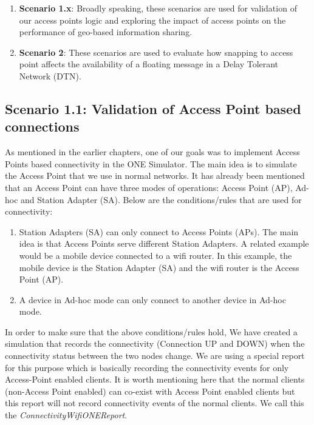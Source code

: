 \begin{enumerate}
	\item \textbf{Scenario 1.x}: Broadly speaking, these scenarios are used for validation of our access points logic and exploring the impact of access points on the performance of geo-based information sharing.
	\item \textbf{Scenario 2}: These scenarios are used to evaluate how snapping to access point affects the availability of a floating message in a Delay Tolerant Network (DTN).
\end{enumerate}
\newpage
\subsection{Scenario 1.1: Validation of Access Point based connections}
As mentioned in the earlier chapters, one of our goals was to implement Access Points based connectivity in the ONE Simulator. The main idea is to simulate the Access Point that we use in normal networks. It has already been mentioned that an Access Point can have three modes of operations: Access Point (AP), Ad-hoc and Station Adapter (SA). Below are the conditions/rules that are used for connectivity:
\begin{enumerate}
	\item Station Adapters (SA) can only connect to Access Points (APs). The main idea is that Access Points serve different Station Adapters. A related example would be a mobile device connected to a wifi router. In this example, the mobile device is the Station Adapter (SA) and the wifi router is the Access Point (AP).
   	\item A device in Ad-hoc mode can only connect to another device in Ad-hoc mode.
\end{enumerate}
In order to make sure that the above conditions/rules hold, We have created a simulation that records the connectivity (Connection UP and DOWN) when the connectivity status between the two nodes change. We are using a special report for this purpose which is basically recording the connectivity events for only Access-Point enabled clients. It is worth mentioning here that the normal clients (non-Access Point enabled) can co-exist with Access Point enabled clients but this report will not record connectivity events of the normal clients. We call this the \textit{ConnectivityWifiONEReport}.
\vspace{3mm}
